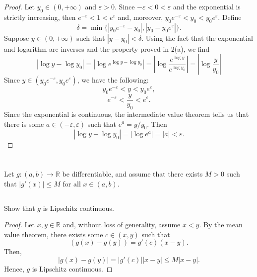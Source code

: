 \documentclass[12pt]{article}
\newenvironment{problem}
    {\begin{lrbox}{\mybox}\begin{minipage}{0.98\textwidth}}
    {\end{minipage}\end{lrbox}\begin{center}\framebox[\textwidth]{\usebox{\mybox}}\end{center}}
\theoremstyle{definition}
\newcommand{\R}{\mathbb{R}}
\newcommand{\eps}{\varepsilon}
\begin{document}
\begin{proof}
    Let $y_0 \in (0, +\infty)$ and $\eps > 0$. Since $-\eps < 0 < \eps$ and the exponential is strictly increasing, then $e^{-\eps} < 1 < e^\eps$ and, moreover, $y_0e^{-\eps} < y_0 < y_0e^\eps$. Define
    \[
        \delta = \min\{|y_0e^{-\eps} - y_0|, |y_0 - y_0e^\eps|\}.
    \]
    Suppose $y \in (0, +\infty)$ such that $|y - y_0| < \delta$. Using the fact that the exponential and logarithm are inverses and the property proved in 2(a), we find
    \[
        |\log y - \log y_0|
            = \left| \log e^{\log y - \log y_0} \right|
            = \left| \log \frac{e^{\log y}}{e^{\log y_0}} \right|
            = \left| \log \frac{y}{y_0} \right|
    \]
    Since $y \in (y_0e^{-\eps}, y_0e^\eps)$, we have the following:
    \[
        y_0e^{-\eps} < y < y_0e^\eps,
    \]
    \[
        e^{-\eps} < \frac{y}{y_0} < e^\eps.
    \]
    Since the exponential is continuous, the intermediate value theorem tells us that there is some $a \in (-\eps, \eps)$  such that $e^a = y/y_0$. Then
    \[
        |\log y - \log y_0|
            = |\log e^a|
            = |a|
            < \eps.
    \]
    
\end{proof}

\newpage
\section{}
\begin{problem}
    Let $g:(a,b)\to \R$ be differentiable, and assume that there exists $M>0$ such that $|g'(x)|\le M$ for all $x \in (a,b)$.
\end{problem}

\subsection{}
\begin{problem}
    Show that $g$ is Lipschitz continuous. 
\end{problem}

\begin{proof}
    Let $x, y \in \R$ and, without loss of generality, assume $x < y$. By the mean value theorem, there exists some $c \in (x, y)$ such that
    \[
        (g(x) - g(y)) = g'(c)(x - y).
    \]
    Then,
    \[
        |g(x) - g(y)| = |g'(c)||x - y| \leq M|x - y|.
    \]
    Hence, $g$ is Lipschitz continuous.
    
\end{proof}
\end{document}
